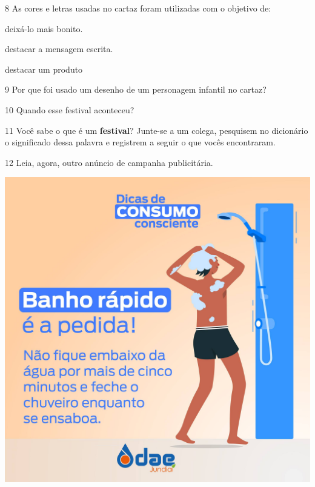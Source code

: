\pagebreak
\num{8} As cores e letras usadas no cartaz foram utilizadas com o objetivo de:

\begin{boxlist}
 deixá-lo mais bonito.

 destacar a mensagem escrita.

 destacar um produto
\end{boxlist}

\num{9} Por que foi usado um desenho de um personagem infantil no cartaz?


\num{10} Quando esse festival aconteceu? 



\num{11} Você sabe o que é um \textbf{festival}? Junte-se a um colega,
pesquisem no dicionário o significado dessa palavra e registrem a seguir 
o que vocês encontraram.


\pagebreak
\num{12} Leia, agora, outro anúncio de campanha publicitária.


\begin{center}
\includegraphics[width=.7\textwidth]{media/image16.jpeg}
\end{center}

